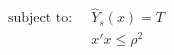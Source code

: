 

\[
\begin{array}{ll} \mbox{subject to:} \;\; & \hat{Y}_{s}(x) = T \\ & x'x \le \rho^{2} \end{array}
\]


